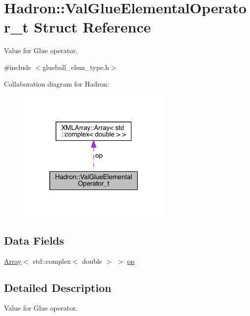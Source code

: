\hypertarget{structHadron_1_1ValGlueElementalOperator__t}{}\section{Hadron\+:\+:Val\+Glue\+Elemental\+Operator\+\_\+t Struct Reference}
\label{structHadron_1_1ValGlueElementalOperator__t}


Value for Glue operator.  




{\ttfamily \#include $<$glueball\+\_\+elem\+\_\+type.\+h$>$}



Collaboration diagram for Hadron\+:\nopagebreak
\begin{figure}[H]
\begin{center}
\leavevmode
\includegraphics[width=214pt]{d5/d0d/structHadron_1_1ValGlueElementalOperator__t__coll__graph}
\end{center}
\end{figure}
\subsection*{Data Fields}
\begin{DoxyCompactItemize}
\item 
\mbox{\hyperlink{classXMLArray_1_1Array}{Array}}$<$ std\+::complex$<$ double $>$ $>$ \mbox{\hyperlink{structHadron_1_1ValGlueElementalOperator__t_ab0bad23294bd9e7f26d0ce2dbdeffef7}{op}}
\end{DoxyCompactItemize}


\subsection{Detailed Description}
Value for Glue operator. 

